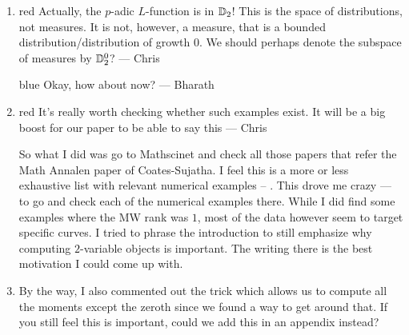 \documentclass[a4paper,11pt]{article}
\newcommand{\CWnote}[1]{
 \begin{color}{red}
 \marginpar{$\spadesuit$} #1
  --- Chris
 \end{color}
}
\newcommand{\BP}[1]{
	\begin{color}{blue}
		\marginpar{$\heartsuit$} #1
		--- Bharath
	\end{color}
}
\newcommand{\CWnote}[1]{

}
\numberwithin{equation}{section}
\begin{document}
{\begin{enumerate}
\CWnote{I generally like to start papers with some extended fluff explaining what we're doing: sort of like a second abstract, but detailing the context in which the paper sits. In particular it is nice for the reader to understand what we've done and why we've done it within the first 5 minutes of picking up the paper. I've written a sketch, and you two can veto/reduce if you object!}



\BP{Actually what you said makes a lot of sense, seems better to start the paper with some motivation than just writing down a bunch of notations. I expanded on what you wrote and added some context for higher codimension Iwasawa theory. I chose to focus almost entirely on the application to pseudo-nullity in the second abstract since the bit about the algorithm and modular symbols appears in the actual abstract and immeditely afterwards}

\item \CWnote{Actually, the $p$-adic $L$-function is in $\mathbb{D}_2$! This is the space of distributions, not measures. It is not, however, a measure, that is a bounded distribution/distribution of growth 0. We should perhaps denote the subspace of measures by $\mathbb{D}_2^0$?}
\BP{Okay, how about now?}

\item
\CWnote{It's really worth checking whether such examples exist. It will be a big boost for our paper to be able to say this}



So what I did was go to Mathscinet and check all those papers that refer the Math Annalen paper of Coates-Sujatha. I feel this is a more or less exhaustive list with relevant numerical examples  -- \cite{MR2287113,MR2830442,MR2916368,MR3810684,MR3440445,lei2018codimension}. This drove me crazy --- to go and check each of the numerical examples there. While I did find some examples where the MW rank was $1$, most of the data however seem to target specific curves. I tried to phrase the introduction to still emphasize why computing $2$-variable objects is important. The writing there is the best motivation I could come up with.

\item By the way, I also commented out the trick which allows us to compute all the moments except the zeroth since we found a way to get around that. If you still feel this is important, could we add this in an appendix instead?
\end{enumerate}
}
\end{document}
